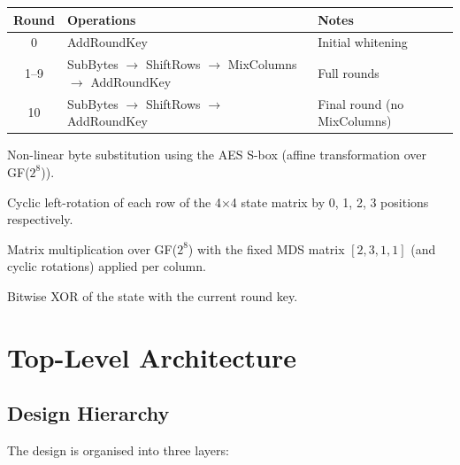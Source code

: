 \documentclass[12pt,a4paper]{article}
\begin{document}
\begin{center}
\begin{tabular}{@{}cll@{}}
\toprule
\textbf{Round} & \textbf{Operations} & \textbf{Notes}\\
\midrule
0   & AddRoundKey                                       & Initial whitening\\
1--9 & SubBytes $\to$ ShiftRows $\to$ MixColumns $\to$ AddRoundKey & Full rounds\\
10  & SubBytes $\to$ ShiftRows $\to$ AddRoundKey        & Final round (no MixColumns)\\
\bottomrule
\end{tabular}
\end{center}

\vspace{0.5em}

\begin{description}[nosep, leftmargin=2cm, style=nextline]
  \item[\textbf{SubBytes}] Non-linear byte substitution using the AES S-box
        (affine transformation over GF($2^8$)).
  \item[\textbf{ShiftRows}] Cyclic left-rotation of each row of the 4×4 state
        matrix by 0, 1, 2, 3 positions respectively.
  \item[\textbf{MixColumns}] Matrix multiplication over GF($2^8$) with the
        fixed MDS matrix $[2,3,1,1]$ (and cyclic rotations) applied per column.
  \item[\textbf{AddRoundKey}] Bitwise XOR of the state with the current round key.
\end{description}

\section{Top-Level Architecture}

\subsection{Design Hierarchy}

The design is organised into three layers:
\end{document}
